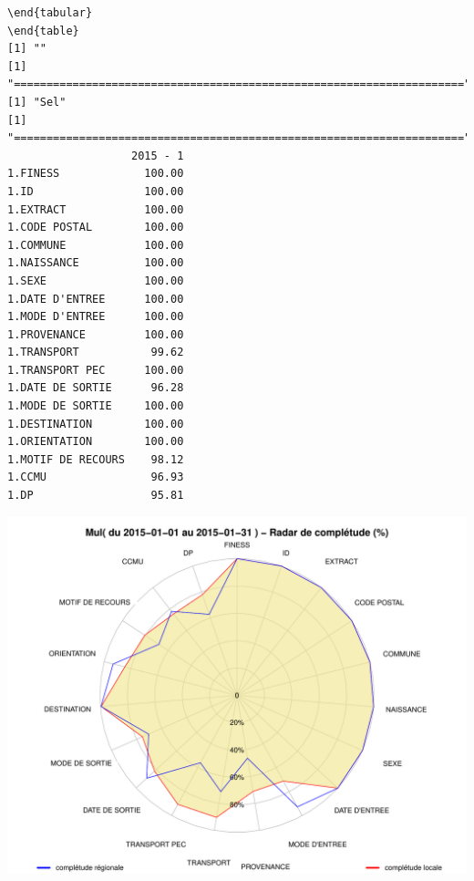 \documentclass[]{article}
\begin{document}
\begin{verbatim}
\end{tabular} 
\end{table} 
[1] ""
[1] "====================================================================="
[1] "Sel"
[1] "====================================================================="
                   2015 - 1
1.FINESS             100.00
1.ID                 100.00
1.EXTRACT            100.00
1.CODE POSTAL        100.00
1.COMMUNE            100.00
1.NAISSANCE          100.00
1.SEXE               100.00
1.DATE D'ENTREE      100.00
1.MODE D'ENTREE      100.00
1.PROVENANCE         100.00
1.TRANSPORT           99.62
1.TRANSPORT PEC      100.00
1.DATE DE SORTIE      96.28
1.MODE DE SORTIE     100.00
1.DESTINATION        100.00
1.ORIENTATION        100.00
1.MOTIF DE RECOURS    98.12
1.CCMU                96.93
1.DP                  95.81
\end{verbatim}

\includegraphics{completude_files/figure-latex/finess-3.pdf}
\end{document}
